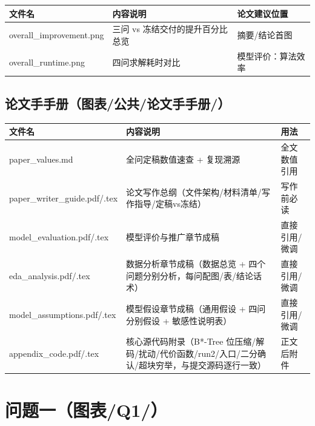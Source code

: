 \documentclass[12pt,a4paper]{article}
\begin{document}
\begin{table}[H]
\centering
\scriptsize
\setlength{\tabcolsep}{1.5pt}
\begin{tabular}{>{\raggedright\arraybackslash}p{4.4cm}>{\raggedright\arraybackslash}p{7.6cm}>{\raggedright\arraybackslash}p{3.4cm}}
\toprule
文件名 & 内容说明 & 论文建议位置 \\
\midrule
overall\_\allowbreak{}improvement.png & 三问 vs 冻结交付的提升百分比总览 & 摘要/结论首图 \\
overall\_\allowbreak{}runtime.png & 四问求解耗时对比 & 模型评价：算法效率 \\
\bottomrule
\end{tabular}
\end{table}

\subsection{论文手手册（图表/公共/论文手手册/）}

\begin{table}[H]
\centering
\scriptsize
\setlength{\tabcolsep}{1.5pt}
\begin{tabular}{>{\raggedright\arraybackslash}p{4.4cm}>{\raggedright\arraybackslash}p{7.6cm}>{\raggedright\arraybackslash}p{3.4cm}}
\toprule
文件名 & 内容说明 & 用法 \\
\midrule
paper\_\allowbreak{}values.md & 全问定稿数值速查 + 复现溯源 & 全文数值引用 \\
paper\_\allowbreak{}writer\_\allowbreak{}guide.pdf/.tex & 论文写作总纲（文件架构/材料清单/写作指导/定稿vs冻结） & 写作前必读 \\
model\_\allowbreak{}evaluation.pdf/.tex & 模型评价与推广章节成稿 & 直接引用/微调 \\
eda\_\allowbreak{}analysis.pdf/.tex & 数据分析章节成稿（数据总览 + 四个问题分别分析，每问配图/表/结论话术） & 直接引用/微调 \\
model\_\allowbreak{}assumptions.pdf/.tex & 模型假设章节成稿（通用假设 + 四问分别假设 + 敏感性说明表） & 直接引用/微调 \\
appendix\_\allowbreak{}code.pdf/.tex & 核心源代码附录（B*-Tree 位压缩/解码/扰动/代价函数/run2/入口/二分确认/超块穷举，与提交源码逐行一致） & 正文后附件 \\
\bottomrule
\end{tabular}
\end{table}

\section{问题一（图表/Q1/）}
\end{document}
